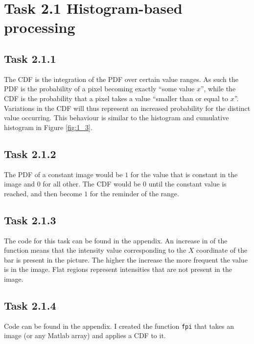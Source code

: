 \section{Task 2.1 Histogram-based processing}

\subsection{Task 2.1.1}
The CDF is the integration of the PDF over certain value ranges. As such the PDF
is the probability of a pixel becoming exactly ``some value $x$'', while the CDF
is the probability that a pixel takes a value ``smaller than or equal to $x$''.
Variations in the CDF will thus represent an increased probability for the
distinct value occurring. This behaviour is similar to the histogram and
cumulative histogram in Figure \ref{fig:1_3}.


\subsection{Task 2.1.2}
The PDF of a constant image would be $1$ for the value that is constant in the
image and $0$ for all other. The CDF would be $0$ until the constant value is
reached, and then become $1$ for the reminder of the range.


\subsection{Task 2.1.3}
The code for this task can be found in the appendix. An increase in of the
function means that the intensity value corresponding to the $X$ coordinate of
the bar is present in the picture. The higher the increase the more frequent the
value is in the image. Flat regions represent intensities that are not present
in the image.



\subsection{Task 2.1.4}
Code can be found in the appendix. I created the function \texttt{fpi} that
takes an image (or any Matlab array)  and applies a CDF to it.


